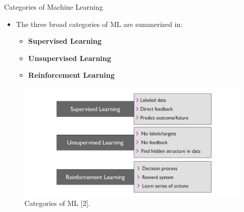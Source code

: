 \documentclass[compress,oilve]{beamer}
\begin{document}
\begin{frame}{Categories of Machine Learning}
\begin{itemize}
\item The three broad categories of ML are summerized in:
\begin{itemize}
\item \textbf{Supervised Learning}
\item \textbf{Unsupervised Learning}  
\item \textbf{Reinforcement Learning} 
\end{itemize}
\end{itemize}
\begin{figure}
\includegraphics[scale=0.5, right]{3}
\caption{Categories of ML [2].}
\end{figure}
\end{frame}
\end{document}
